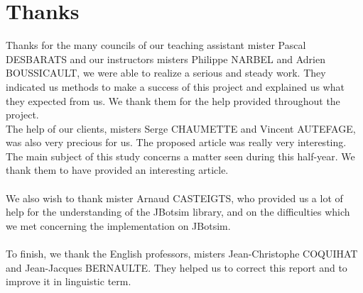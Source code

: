 \chapter*{Thanks}

Thanks for the many councils of our teaching assistant mister Pascal DESBARATS and our instructors misters Philippe NARBEL and Adrien BOUSSICAULT, we were able to realize a serious and steady work. They indicated us methods to make a success of this project and explained us what they expected from us. We thank them for the help provided throughout the project.\\

The help of our clients, misters Serge CHAUMETTE and Vincent AUTEFAGE, was also very precious for us. The proposed article was really very interesting. The main subject of this study concerns a matter seen during this half-year. We thank them to have provided an interesting article.\\\\

We also wish to thank mister Arnaud CASTEIGTS, who provided us a lot of help for the understanding of the JBotsim library, and on the difficulties which we met concerning the implementation on JBotsim.\\\\

To finish, we thank the English professors, misters Jean-Christophe COQUIHAT and Jean-Jacques BERNAULTE. They helped us to correct this report and to improve it in linguistic term.